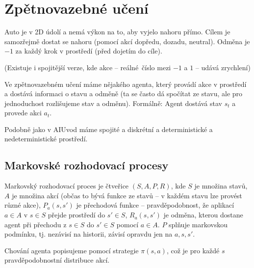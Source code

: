 \documentclass[12pt]{article}					%
\begin{document}

\section{Zpětnovazebné učení}
\begin{definice}
	Auto je v 2D údolí a nemá výkon na to, aby vyjelo nahoru přímo. Cílem je samozřejmě dostat se nahoru (pomocí akcí dopředu, dozadu, neutral). Odměna je $-1$ za každý krok v prostředí (před dojetím do cíle).

	(Existuje i spojitější verze, kde akce -- reálné číslo mezi $-1$ a $1$ -- udává zrychlení)
\end{definice}

\begin{definice}
	Ve zpětnovazebném učení máme nějakého agenta, který provádí akce v prostředí a dostává informaci o stavu a odměně (ta se často dá spočítat ze stavu, ale pro jednoduchost rozlišujeme stav a odměnu). Formálně: Agent dostává stav $s_t$ a provede akci $a_t$.
\end{definice}

\begin{definice}
	Podobně jako v AIUvod máme spojité a diskrétní a deterministické a nedeterministické prostředí.
\end{definice}

\subsection{Markovské rozhodovací procesy}
\begin{definice}
	Markovský rozhodovací proces je čtveřice $(S, A, P, R)$, kde $S$ je množina stavů, $A$ je množina akcí (občas to bývá funkce ze stavů -- v každém stavu lze provést různé akce), $P_a(s, s')$ je přechodová funkce -- pravděpodobnost, že aplikací $a \in A$ v $s \in S$ přejde prostředí do $s' \in S$, $R_a(s, s')$ je odměna, kterou dostane agent při přechodu z $s \in S$ do $s' \in S$ pomocí $a \in A$. $P$ splňuje markovskou podmínku, tj. nezávisí na historii, závisí opravdu jen na $a, s, s'$.
\end{definice}

\begin{definice}
	Chování agenta popisujeme pomocí strategie $\pi(s, a)$, což je pro každé $s$ pravděpodobnostní distribuce akcí.
\end{definice}
\end{document}
